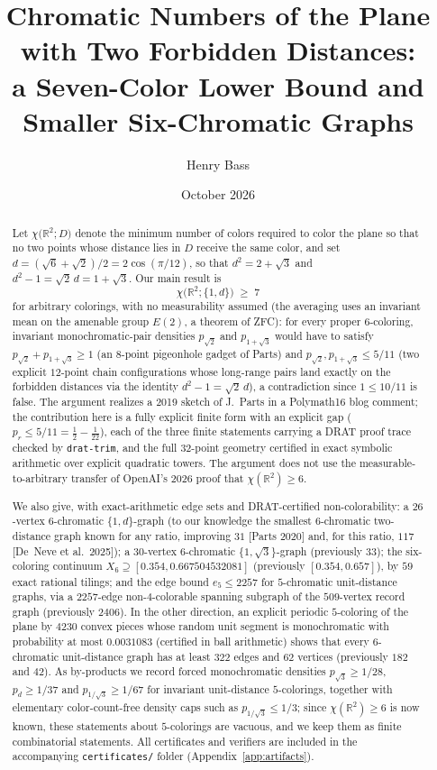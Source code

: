 \documentclass[11pt]{article}
\title{Chromatic Numbers of the Plane with Two Forbidden Distances:\\
a Seven-Color Lower Bound and Smaller Six-Chromatic Graphs}
\author{Henry Bass}
\date{October 2026}
\theoremstyle{definition}
\theoremstyle{remark}
\newcommand{\R}{\mathbb{R}}
\newcommand{\dd}{d}                          %
\newcommand{\chid}[1]{\chi\bigl(\R^2;#1\bigr)}
\begin{document}
\maketitle

\begin{abstract}
Let $\chid{D}$ denote the minimum number of colors required to color the
plane so that no two points whose distance lies in $D$ receive the same
color, and set $\dd=(\sqrt6+\sqrt2)/2=2\cos(\pi/12)$, so that
$\dd^2=2+\sqrt3$ and $\dd^2-1=\sqrt2\,\dd=1+\sqrt3$.  Our main result is
\[
  \chid{\{1,\dd\}}\;\ge\;7
\]
for arbitrary colorings, with no measurability assumed (the averaging uses an invariant mean on the amenable group $E(2)$, a theorem of ZFC): for every proper
$6$-coloring, invariant monochromatic-pair densities $p_{\sqrt2}$ and
$p_{1+\sqrt3}$ would have to satisfy $p_{\sqrt2}+p_{1+\sqrt3}\ge 1$
(an $8$-point pigeonhole gadget of Parts) and $p_{\sqrt2},p_{1+\sqrt3}\le
5/11$ (two explicit $12$-point chain configurations whose long-range pairs
land exactly on the forbidden distances via the identity
$\dd^2-1=\sqrt2\,\dd$), a contradiction since $1\le 10/11$ is false.  The
argument realizes a 2019 sketch of J.~Parts in a Polymath16 blog comment;
the contribution here is a fully explicit finite form with an explicit
gap ($p_r\le 5/11=\tfrac12-\tfrac1{22}$), each of the three finite
statements carrying a DRAT proof trace checked by \texttt{drat-trim},
and the full $32$-point geometry certified in exact symbolic arithmetic
over explicit quadratic towers.  The argument does not use the
measurable-to-arbitrary transfer of OpenAI's 2026 proof that
$\chi(\R^2)\ge6$.

We also give, with exact-arithmetic edge sets and DRAT-certified
non-colorability: a $26$-vertex $6$-chromatic $\{1,\dd\}$-graph (to our
knowledge the smallest $6$-chromatic two-distance graph known for any
ratio, improving $31$ [Parts 2020] and, for this ratio, $117$ [De~Neve
et al.\ 2025]); a $30$-vertex $6$-chromatic $\{1,\sqrt3\}$-graph
(previously $33$); the six-coloring continuum
$X_6\supseteq[0.354,0.667504532081]$ (previously $[0.354,0.657]$), by
$59$ exact rational tilings; and the edge bound $e_5\le 2257$ for
$5$-chromatic unit-distance graphs, via a $2257$-edge non-$4$-colorable
spanning subgraph of the $509$-vertex record graph (previously $2406$).
In the other direction, an explicit periodic $5$-coloring of the plane
by $4230$ convex pieces whose random unit segment is monochromatic with
probability at most $0.0031083$ (certified in ball arithmetic) shows
that every $6$-chromatic unit-distance graph has at least $322$ edges
and $62$ vertices (previously $182$ and $42$).
As by-products we record forced monochromatic densities
$p_{\sqrt3}\ge 1/28$, $p_{\dd}\ge 1/37$ and $p_{1/\sqrt3}\ge1/67$ for
invariant unit-distance $5$-colorings, together with elementary
color-count-free density caps such as $p_{1/\sqrt3}\le1/3$; since
$\chi(\R^2)\ge6$ is now known, these statements about $5$-colorings are
vacuous, and we keep them as finite combinatorial statements.  All
certificates and verifiers are included in the accompanying
\texttt{certificates/} folder (Appendix~\ref{app:artifacts}).
\end{abstract}
\end{document}
